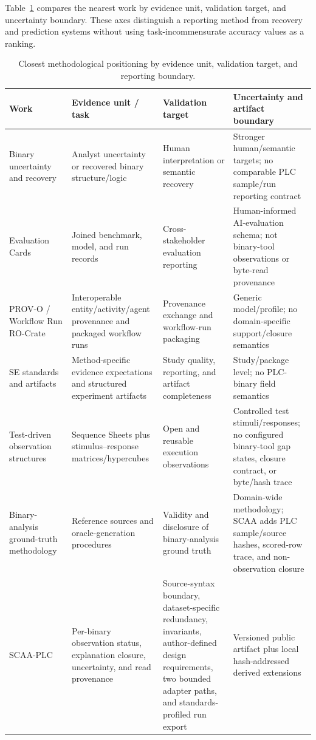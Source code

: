 \documentclass[a4paper,fleqn]{cas-dc}
\begin{document}
Table~\ref{tab:closest_work} compares the nearest work by evidence unit, validation target, and uncertainty boundary. These axes distinguish a reporting method from recovery and prediction systems without using task-incommensurate accuracy values as a ranking.

\begin{table}[t]
\centering
\normalsize
\caption{Closest methodological positioning by evidence unit, validation target, and reporting boundary.}
\label{tab:closest_work}
\begin{tabularx}{\textwidth}{>{\raggedright\arraybackslash}p{}>{\raggedright\arraybackslash}p{}>{\raggedright\arraybackslash}p{}>{\raggedright\arraybackslash}X}
\toprule
Work & Evidence unit / task & Validation target & Uncertainty and artifact boundary \\
\midrule
Binary uncertainty and recovery~\citep{euba_sandia2021,icsref_ndss2019,clever_tifs2024} & Analyst uncertainty or recovered binary structure/logic & Human interpretation or semantic recovery & Stronger human/semantic targets; no comparable PLC sample/run reporting contract \\
Evaluation Cards~\citep{evaluation_cards_arxiv2026} & Joined benchmark, model, and run records & Cross-stakeholder evaluation reporting & Human-informed AI-evaluation schema; not binary-tool observations or byte-read provenance \\
PROV-O / Workflow Run RO-Crate~\citep{w3c_prov_o2013,leo_workflow_run_rocrate2024} & Interoperable entity/activity/agent provenance and packaged workflow runs & Provenance exchange and workflow-run packaging & Generic model/profile; no domain-specific support/closure semantics \\
SE standards and artifacts~\citep{ralph_empirical_standards2021,guevara_vega_research_artifacts2024} & Method-specific evidence expectations and structured experiment artifacts & Study quality, reporting, and artifact completeness & Study/package level; no PLC-binary field semantics \\
Test-driven observation structures~\citep{kessel_atkinson_open_science2024} & Sequence Sheets plus stimulus--response matrices/hypercubes & Open and reusable execution observations & Controlled test stimuli/responses; no configured binary-tool gap states, closure contract, or byte/hash trace \\
Binary-analysis ground-truth methodology~\citep{alves_foss_ground_truth2022} & Reference sources and oracle-generation procedures & Validity and disclosure of binary-analysis ground truth & Domain-wide methodology; SCAA adds PLC sample/source hashes, scored-row trace, and non-observation closure \\
SCAA-PLC & Per-binary observation status, explanation closure, uncertainty, and read provenance & Source-syntax boundary, dataset-specific redundancy, invariants, author-defined design requirements, two bounded adapter paths, and standards-profiled run export & Versioned public artifact plus local hash-addressed derived extensions \\
\bottomrule
\end{tabularx}
\end{table}
\end{document}

